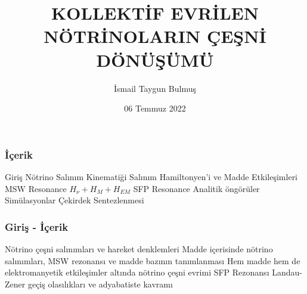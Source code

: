 \documentclass[10pt]{beamer}
\title[Kollektif Nötrino Salınımları]{\huge \textbf{KOLLEKTİF EVRİLEN NÖTRİNOLARIN ÇEŞNİ DÖNÜŞÜMÜ}\vspace{0.5cm}} %
\author{\Large{İsmail Taygun Bulmuş}\vspace{1cm}} %
\institute[MSGSÜ, Fizik Bölümü] %
{\vspace{1cm}
{\large \textbf{Doktora Tez Savunması}}}
\date{06 Temmuz 2022} %
\begin{document}
\shorthandoff{=}

\begin{frame}
\titlepage %
\end{frame}

\begin{frame}
    \frametitle{İçerik}
    \begin{outline}
        \1[\textbullet] Giriş
        \1[\textbullet] Nötrino Salınım Kinematiği
        \1[\textbullet] Salınım Hamiltonyen'i ve Madde Etkileşimleri
        \2[\textendash] MSW Resonance
        \1[\textbullet] $H_{\nu}+ H_{M}+ H_{EM}$
        \2[\textendash] SFP Resonance
        \1[\textbullet] Analitik öngörüler
        \1[\textbullet] Simülasyonlar
        \1[\textbullet] Çekirdek Sentezlenmesi
    \end{outline}
\end{frame}

\begin{frame}
    \frametitle{Giriş - İçerik}
    \begin{outline}
        \1[\textbullet] Nötrino çeşni salınımları ve hareket denklemleri
        \1[\textbullet] Madde içerisinde nötrino salınımları, MSW rezonansı ve madde bazının tanımlanması
        \1[\textbullet] Hem madde hem de elektromanyetik etkileşimler altında nötrino çeşni evrimi
        \2[\textendash] SFP Rezonansı
        \1[\textbullet] Landau-Zener geçiş olasılıkları ve adyabatiste kavramı
    \end{outline}
\end{frame}
\end{document}
